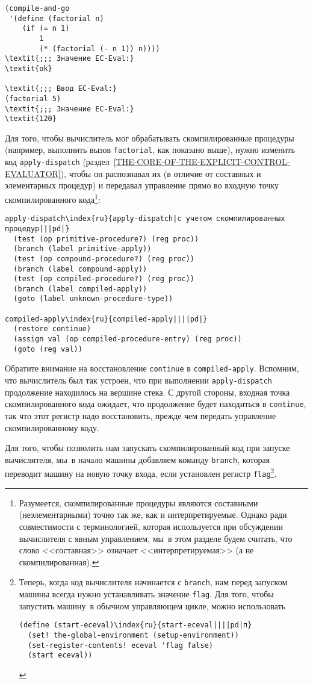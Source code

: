 \begin{Verbatim}[fontsize=\small]
(compile-and-go
 '(define (factorial n)
    (if (= n 1)
        1
        (* (factorial (- n 1)) n))))
\textit{;;; Значение EC-Eval:}
\textit{ok}

\textit{;;; Ввод EC-Eval:}
(factorial 5)
\textit{;;; Значение EC-Eval:}
\textit{120}
\end{Verbatim}

Для того, чтобы вычислитель мог обрабатывать
скомпилированные процедуры (например, выполнить вызов
{\tt factorial}, как показано выше), нужно изменить код
{\tt apply-dispatch} 
(раздел~\ref{THE-CORE-OF-THE-EXPLICIT-CONTROL-EVALUATOR}),
чтобы он распознавал их (в отличие от составных и элементарных
процедур) и передавал управление прямо во входную точку
скомпилированного кода\footnote{Разумеется, скомпилированные процедуры являются
составными (неэлементарными) точно так же, как и интерпретируемые.
Однако ради совместимости с терминологией, которая используется при
обсуждении вычислителя с явным управлением, мы~в этом разделе будем
считать, что слово <<составная>> означает <<интерпретируемая>> (а не
скомпилированная).
}:

\begin{Verbatim}[fontsize=\small]
apply-dispatch\index{ru}{apply-dispatch|с учетом скомпилированных процедур|||pd|}
  (test (op primitive-procedure?) (reg proc))
  (branch (label primitive-apply))
  (test (op compound-procedure?) (reg proc))  
  (branch (label compound-apply))
  (test (op compiled-procedure?) (reg proc))  
  (branch (label compiled-apply))
  (goto (label unknown-procedure-type))

compiled-apply\index{ru}{compiled-apply||||pd|}
  (restore continue)
  (assign val (op compiled-procedure-entry) (reg proc))
  (goto (reg val))
\end{Verbatim}
Обратите внимание на восстановление {\tt continue} в
{\tt compiled-apply}.  Вспомним, что вычислитель был так
устроен, что при выполнении {\tt apply-dis\-patch} продолжение
находилось на вершине стека.  С другой стороны, входная точка
скомпилированного кода ожидает, что продолжение будет находиться в
{\tt continue}, так что этот регистр надо восстановить, прежде
чем передать управление скомпилированному коду.

Для того, чтобы позволить нам запускать скомпилированный
код при запуске вычислителя, мы~в начало машины добавляем команду
{\tt branch}, которая переводит машину на новую точку входа,
если установлен регистр {\tt flag}\footnote{Теперь, когда код вычислителя начинается с
{\tt branch}, нам перед запуском машины всегда нужно
устанавливать значение {\tt flag}.  Для того, чтобы запустить
машину~в обычном управляющем цикле, можно использовать

\begin{Verbatim}
(define (start-eceval)\index{ru}{start-eceval||||pd|п}
  (set! the-global-environment (setup-environment))
  (set-register-contents! eceval 'flag false)
  (start eceval))
\end{Verbatim}
}. %

